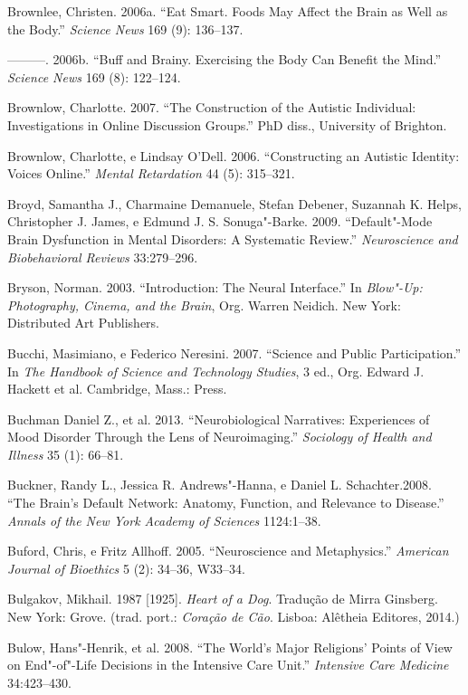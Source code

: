 Brownlee, Christen. 2006a. ``Eat Smart. Foods May Affect the Brain as
Well as the Body.'' \emph{Science News} 169 (9): 136--137.

---------. 2006b. ``Buff and Brainy. Exercising the Body Can Benefit the
Mind.'' \emph{Science News} 169 (8): 122--124.

Brownlow, Charlotte. 2007. ``The Construction of the Autistic
Individual: Investigations in Online Discussion Groups.'' PhD diss.,
University of Brighton.

Brownlow, Charlotte, e Lindsay O'Dell. 2006. ``Constructing an Autistic
Identity:  Voices Online.'' \emph{Mental Retardation} 44 (5):
315--321.

Broyd, Samantha J., Charmaine Demanuele, Stefan Debener, Suzannah K.
Helps, Christopher J. James, e Edmund J. S. Sonuga"-Barke. 2009.
``Default"-Mode Brain Dysfunction in Mental Disorders: A Systematic
Review.'' \emph{Neuroscience and Biobehavioral Reviews} 33:279--296.

Bryson, Norman. 2003. ``Introduction: The Neural Interface.'' In
\emph{Blow"-Up: Photography, Cinema, and the Brain}, Org. Warren Neidich.
New York: Distributed Art Publishers.

Bucchi, Masimiano, e Federico Neresini. 2007. ``Science and Public
Participation.'' In \emph{The Handbook of Science and Technology
Studies}, 3 ed., Org. Edward J. Hackett et al. Cambridge, Mass.: 
Press.

Buchman Daniel Z., et al. 2013. ``Neurobiological Narratives:
Experiences of Mood Disorder Through the Lens of Neuroimaging.''
\emph{Sociology of Health and Illness} 35 (1): 66--81.

Buckner, Randy L., Jessica R. Andrews"-Hanna, e Daniel L. Schachter.2008.
``The Brain's Default Network: Anatomy, Function, and Relevance to
Disease.'' \emph{Annals of the New York Academy of Sciences} 1124:1--38.

Buford, Chris, e Fritz Allhoff. 2005. ``Neuroscience and Metaphysics.''
\emph{American Journal of Bioethics} 5 (2): 34--36, W33--34.

Bulgakov, Mikhail. 1987 {[}1925{]}. \emph{Heart of a Dog}. Tradução de
Mirra Ginsberg. New York: Grove. (trad. port.: \emph{Coração de Cão}.
Lisboa: Alêtheia Editores, 2014.)

Bulow, Hans"-Henrik, et al. 2008. ``The World's Major Religions' Points
of View on End"-of"-Life Decisions in the Intensive Care Unit.''
\emph{Intensive Care Medicine} 34:423--430.

